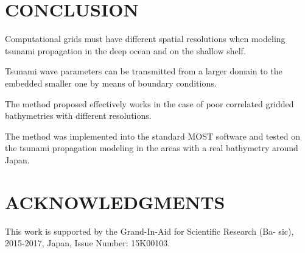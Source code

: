 \documentclass{aip-cp}
\begin{document}
\section{CONCLUSION}

Computational grids must have different spatial resolutions when modeling 
tsunami propagation in the deep ocean and on the shallow shelf.

Tsunami wave parameters can be transmitted from a larger domain to the 
embedded smaller one by means of boundary conditions.

The method proposed effectively works in the case of poor correlated gridded 
bathymetries with different resolutions.

The method was implemented into the standard MOST software and tested on the 
tsunami propagation modeling in the areas with a real bathymetry around 
Japan. 




\section{ACKNOWLEDGMENTS}
This work is supported by the Grand-In-Aid for Scientific Research (Ba- sic), 2015-2017, Japan, Issue Number: 15K00103.


\nocite{*}
%
%
\end{document}
